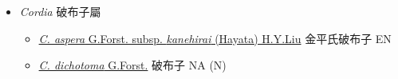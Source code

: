 
  \begin{itemize}
 \item[] \textit{Cordia} 破布子屬
                                
  \begin{itemize}
        \item[] \href{http://www.theplantlist.org/tpl1.1/search?q=Cordia+aspera+subsp.+kanehirai}{\textit{C. aspera} G.Forst. subsp. \textit{kanehirai} (Hayata) H.Y.Liu}   金平氏破布子   EN
        \item[] \href{http://www.theplantlist.org/tpl1.1/search?q=Cordia+dichotoma}{\textit{C. dichotoma} G.Forst.}   破布子   NA (N)
  \end{itemize}
  \end{itemize}
